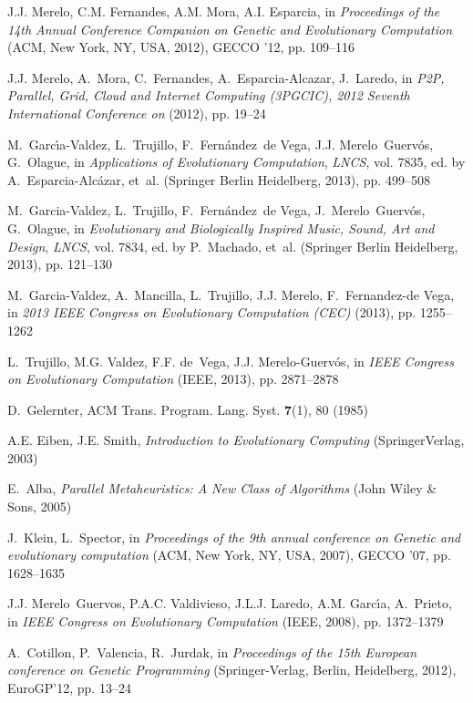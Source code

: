 \begin{thebibliography}{10}
J.J. Merelo, C.M. Fernandes, A.M. Mora, A.I. Esparcia, in \emph{Proceedings of
  the 14th Annual Conference Companion on Genetic and Evolutionary Computation}
  (ACM, New York, NY, USA, 2012), GECCO '12, pp. 109--116

J.J. Merelo, A.~Mora, C.~Fernandes, A.~Esparcia-Alcazar, J.~Laredo, in
  \emph{P2P, Parallel, Grid, Cloud and Internet Computing (3PGCIC), 2012
  Seventh International Conference on} (2012), pp. 19--24

M.~Garc{\'\i}a-Valdez, L.~Trujillo, F.~Fern{\'a}ndez~de Vega, J.J.
  Merelo~Guerv\'os, G.~Olague, in \emph{Applications of Evolutionary
  Computation}, \emph{LNCS}, vol. 7835, ed. by A.~Esparcia-Alc{\'a}zar, et~al.
  (Springer Berlin Heidelberg, 2013), pp. 499--508

M.~Garcia-Valdez, L.~Trujillo, F.~Fern{\'a}ndez~de Vega, J.~Merelo~Guerv{\'o}s,
  G.~Olague, in \emph{Evolutionary and Biologically Inspired Music, Sound, Art
  and Design}, \emph{LNCS}, vol. 7834, ed. by P.~Machado, et~al. (Springer
  Berlin Heidelberg, 2013), pp. 121--130

M.~Garcia-Valdez, A.~Mancilla, L.~Trujillo, J.J. Merelo, F.~Fernandez-de Vega,
  in \emph{2013 IEEE Congress on Evolutionary Computation (CEC)} (2013), pp.
  1255--1262

L.~Trujillo, M.G. Valdez, F.F. de~Vega, J.J. Merelo-Guerv\'os, in \emph{IEEE
  Congress on Evolutionary Computation} (IEEE, 2013), pp. 2871--2878

D.~Gelernter, ACM Trans. Program. Lang. Syst. \textbf{7}(1), 80 (1985)

A.E. Eiben, J.E. Smith, \emph{Introduction to Evolutionary Computing}
  (SpringerVerlag, 2003)

E.~Alba, \emph{Parallel Metaheuristics: {A} New Class of Algorithms} (John
  Wiley \& Sons, 2005)

J.~Klein, L.~Spector, in \emph{Proceedings of the 9th annual conference on
  Genetic and evolutionary computation} (ACM, New York, NY, USA, 2007), GECCO
  '07, pp. 1628--1635

J.J. Merelo~Guervos, P.A.C. Valdivieso, J.L.J. Laredo, A.M. Garc{\'\i}a,
  A.~Prieto, in \emph{IEEE Congress on Evolutionary Computation} (IEEE, 2008),
  pp. 1372--1379

A.~Cotillon, P.~Valencia, R.~Jurdak, in \emph{Proceedings of the 15th European
  conference on Genetic Programming} (Springer-Verlag, Berlin, Heidelberg,
  2012), EuroGP'12, pp. 13--24


\end{thebibliography}
